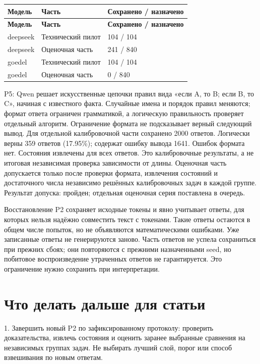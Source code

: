 \documentclass[11pt,a4paper]{article}
\begin{document}
\begingroup\fontsize{9.3}{12}\selectfont
\begin{longtable}{@{}P{31.09mm}P{62.18mm}P{62.18mm}@{}}
\toprule
\textbf{Модель} & \textbf{Часть} & \textbf{Сохранено / назначено} \\
\midrule
\endfirsthead
\toprule
\textbf{Модель} & \textbf{Часть} & \textbf{Сохранено / назначено} \\
\midrule
\endhead
\bottomrule
\endfoot
deepseek & Технический пилот & 104 / 104 \\[3pt]
deepseek & Оценочная часть & 241 / 840 \\[3pt]
goedel & Технический пилот & 104 / 104 \\[3pt]
goedel & Оценочная часть & 0 / 840 \\[3pt]
\end{longtable}
\endgroup
P5: Qwen решает искусственные цепочки правил вида «если A, то B; если B, то C», начиная с известного факта. Случайные имена и порядок правил меняются; формат ответа ограничен грамматикой, а логическую правильность проверяет отдельный алгоритм. Ограничение формата не подсказывает верный следующий вывод. Для отдельной калибровочной части сохранено 2000 ответов. Логически верны 359 ответов (17.95\%); содержат ошибку вывода 1641. Ошибок формата нет. Состояния извлечены для всех ответов. Это калибровочные результаты, а не итоговая независимая проверка зависимости от длины. Оценочная часть допускается только после проверки формата, извлечения состояний и достаточного числа независимо решённых калибровочных задач в каждой группе. Результат допуска: пройден; отдельная оценочная серия поставлена в очередь.

Восстановление P2 сохраняет исходные токены и явно учитывает ответы, для которых нельзя надёжно совместить текст с токенами. Такие ответы остаются в общем числе попыток, но не объявляются математическими ошибками. Уже записанные ответы не генерируются заново. Часть ответов не успела сохраниться при прежних сбоях; они повторяются с прежними назначенными seed, но побитовое воспроизведение утраченных ответов не гарантируется. Это ограничение нужно сохранить при интерпретации.

\section{Что делать дальше для статьи}
1. Завершить новый P2 по зафиксированному протоколу: проверить доказательства, извлечь состояния и оценить заранее выбранные сравнения на независимых группах задач. Не выбирать лучший слой, порог или способ взвешивания по новым ответам.
\end{document}
